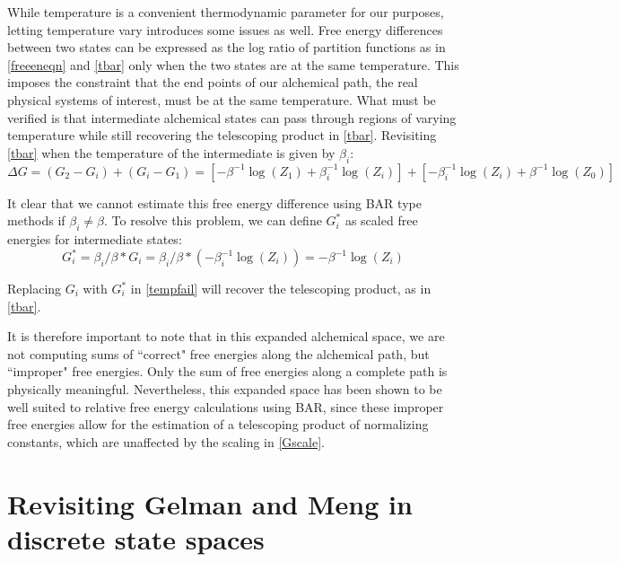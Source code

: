 While temperature is a convenient thermodynamic parameter for our purposes, letting temperature vary introduces some issues as well. Free energy differences between two states can be expressed as the log ratio of partition functions as in \eqref{freeeneqn} and \eqref{tbar} only when the two states are at the same temperature. This imposes the constraint that the end points of our alchemical path, the real physical systems of interest, must be at the same temperature.
What must be verified is that intermediate alchemical states can pass through regions of varying temperature while still recovering the telescoping product in \eqref{tbar}. Revisiting \eqref{tbar} when the temperature of the intermediate is given by $\beta_i$:
\begin{equation} \label{tempfail}
\Delta G=(G_2-G_i) + (G_i-G_1) = [-\beta^{-1} \log(Z_1) + \beta_i^{-1} \log(Z_i)] + [-\beta_i^{-1}\log(Z_i) +\beta^{-1}\log(Z_0)]
\end{equation}

\noindent It clear that we cannot estimate this free energy difference using BAR type methods if $\beta_i \neq \beta$.
To resolve this problem, we can define $G_i^\ast$ as scaled free energies for intermediate states:
\begin{equation} \label{Gscale}
G_i^\ast = \beta_i/\beta *G_i = \beta_i/\beta * (-\beta_i^{-1} \log(Z_i)) = -\beta^{-1} \log(Z_i)
\end{equation}

\noindent Replacing $G_i$ with $G_i^\ast$ in \eqref{tempfail} will recover the telescoping product, as in \eqref{tbar}.

It is therefore important to note that in this expanded alchemical space, we are not computing sums of ``correct" free energies along the alchemical path, but ``improper" free energies. 
Only the sum of free energies along a complete path is physically meaningful.
Nevertheless, this expanded space has been shown to be well suited to relative free energy calculations using BAR, since these improper free energies allow for the estimation of a telescoping product of normalizing constants, which are unaffected by the scaling in \eqref{Gscale}.

\section{Revisiting Gelman and Meng in discrete state spaces}


